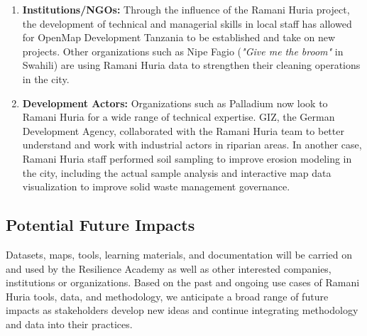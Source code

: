 \documentclass[a4paper,12pt,twoside]{article}
\begin{document}
\begin{mdframed}[hidealllines=true,backgroundcolor=RHgreen!10,innerleftmargin=6pt,innerrightmargin=6pt,leftmargin=-3pt,rightmargin=-3pt]
\begin{enumerate}
\item \textbf{Institutions/NGOs:} Through the influence of the Ramani Huria project, the development of technical and managerial skills in local staff has allowed for OpenMap Development Tanzania to be established and take on new projects. Other organizations such as Nipe Fagio (\textit{"Give me the broom"} in Swahili) are using Ramani Huria data to strengthen their cleaning operations in the city.
\item \textbf{Development Actors:} Organizations such as Palladium now look to Ramani Huria for a wide range of technical expertise. GIZ, the German Development Agency, collaborated with the Ramani Huria team to better understand and work with industrial actors in riparian areas. In another case, Ramani Huria staff performed soil sampling to improve erosion modeling in the city, including the actual sample analysis and interactive map data visualization to improve solid waste management governance.   
\end{enumerate}
\end{mdframed}

\subsection{Potential Future Impacts}
Datasets, maps, tools, learning materials, and documentation will be carried on and used by the Resilience Academy as well as other interested companies, institutions or organizations. Based on the past and ongoing use cases of Ramani Huria tools, data, and methodology, we anticipate a broad range of future impacts as stakeholders develop new ideas and continue integrating methodology and data into their practices. 
\end{document}
